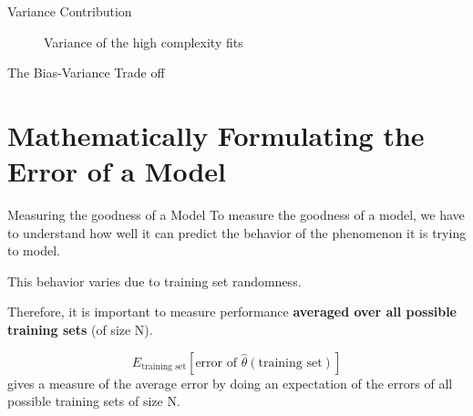 \documentclass{beamer}
\begin{document}
\begin{frame}{Variance Contribution}
{\begin{figure}
\vspace*{-0.3cm}
\caption{Variance of the high complexity fits}
\end{figure}}

\end{frame}

\begin{frame}{The Bias-Variance Trade off}
\end{frame}

\section{Mathematically Formulating the Error of a Model}

\begin{frame}{Measuring the goodness of a Model}
To measure the goodness of a model, we have to understand how well it can predict the behavior of the phenomenon it is trying to model.
\pause

This behavior varies due to training set randomness.
\pause 

Therefore, it is important to measure performance \textbf{averaged over all possible training sets} (of size N). 
\pause

$$E_{\text{training set}}[\text{error of } \hat\theta(\text{training set})] $$
gives a measure of the average error by doing an expectation of the errors of all possible training sets of size N.
\end{frame}
\end{document}

